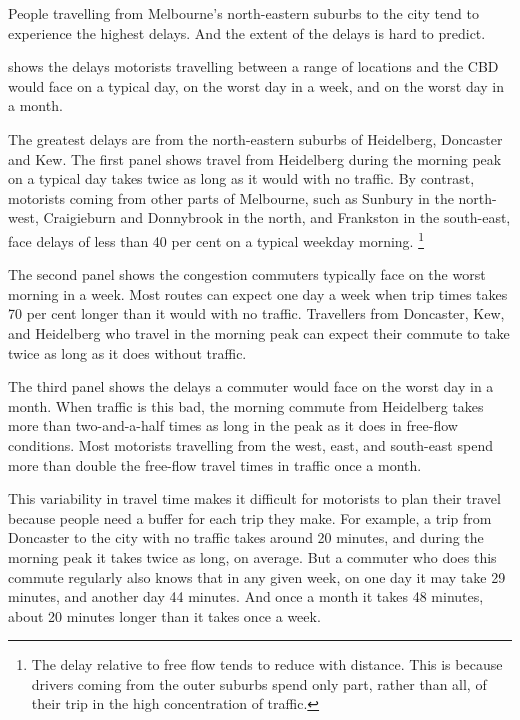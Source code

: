 \documentclass{grattan}
\begin{document}
People travelling from Melbourne's north-eastern suburbs to the city tend to experience the highest delays.
And the extent of the delays is hard to predict.

 shows the delays motorists travelling between a range of locations and the CBD would face on a typical day, on the worst day in a week, and on the worst day in a month.

The greatest delays are from the north-eastern suburbs of Heidelberg, Doncaster and Kew.
The first panel shows travel from Heidelberg during the morning peak on a typical day takes twice as long as it would with no traffic.
By contrast, motorists coming from other parts of Melbourne, such as Sunbury in the north-west, Craigieburn and Donnybrook in the north, and Frankston in the south-east, face delays of less than 40 per cent on a typical weekday morning.%
    \footnote{The delay relative to free flow tends to reduce with distance.
This is because drivers coming from the outer suburbs spend only part, rather than all, of their trip in the high concentration of traffic.}

The second panel shows the congestion commuters typically face on the worst morning in a week.
Most routes can expect one day a week when trip times takes 70 per cent longer than it would with no traffic.
Travellers from Doncaster, Kew, and Heidelberg who travel in the morning peak can expect their commute to take twice as long as it does without traffic.

The third panel shows the delays a commuter would face on the worst day in a month.
When traffic is this bad, the morning commute from Heidelberg takes more than two-and-a-half times as long in the peak as it does in free-flow conditions.
Most motorists travelling from the west, east, and south-east spend more than double the free-flow travel times in traffic once a month.


This variability in travel time makes it difficult for motorists to plan their travel because people need a buffer for each trip they make. For example, a trip from Doncaster to the city with no traffic takes around 20 minutes, and during the morning peak it takes twice as long, on average.
But a commuter who does this commute regularly also knows that in any given week, on one day it may take 29 minutes, and another day 44 minutes. And once a month it takes 48 minutes, about 20 minutes longer than it takes once a week.
\end{document}
